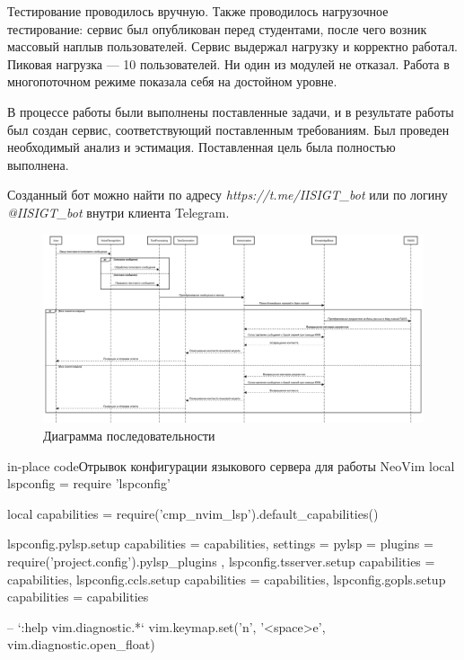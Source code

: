 Тестирование проводилось вручную. Также проводилось нагрузочное тестирование:
сервис был опубликован перед студентами, после чего возник массовый наплыв
пользователей. Сервис выдержал нагрузку и корректно работал. Пиковая нагрузка
--- 10 пользователей. Ни один из модулей не отказал. Работа в многопоточном
режиме показала себя на достойном уровне.


В процессе работы были выполнены поставленные задачи, и в результате работы был
создан сервис, соответствующий поставленным требованиям. Был проведен
необходимый анализ и эстимация. Поставленная цель была полностью выполнена.

Созданный бот можно найти по адресу \emph{https://t.me/IISIGT\_bot} или по логину 
\emph{@IISIGT\_bot} внутри клиента Telegram.

\showbib


\begin{figure}[H]
    \centering
    \includegraphics[width=1.2\textwidth, angle=90]{Диаграмма последовательности.png}
    \caption{Диаграмма последовательности}\label{Диаграмма последовательности.png}
\end{figure}


\begin{codepiece}{in-place code}{Отрывок конфигурации языкового сервера для работы NeoVim}
local lspconfig = require 'lspconfig'

local capabilities = require('cmp_nvim_lsp').default_capabilities()

lspconfig.pylsp.setup {
  capabilities = capabilities,
  settings = { pylsp = { plugins = require('project.config').pylsp_plugins } },
}
lspconfig.tsserver.setup {
  capabilities = capabilities,
}
lspconfig.ccls.setup {
  capabilities = capabilities,
}
lspconfig.gopls.setup {
  capabilities = capabilities
}

-- `:help vim.diagnostic.*`
vim.keymap.set('n', '<space>e', vim.diagnostic.open_float)
\end{codepiece}

